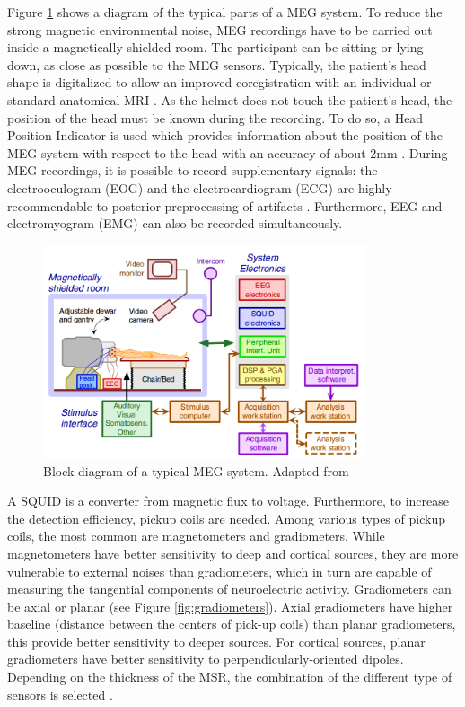 Figure \ref{fig:MEGdiagram} shows a diagram of the typical parts of a MEG system. To reduce the strong magnetic environmental noise, MEG recordings have to be carried out inside a magnetically shielded room. The participant can be sitting or lying down, as close as possible to the MEG sensors. Typically, the patient's head shape is digitalized to allow an improved coregistration with an individual or standard anatomical MRI \citep{Gross2013}. As the helmet does not touch the patient's head, the position of the head must be known during the recording. To do so, a Head Position Indicator is used which provides information about the position of the MEG system with respect to the head with an accuracy of about 2mm \citep{Hari2004}. During MEG recordings, it is possible to record supplementary signals: the electrooculogram (EOG) and the electrocardiogram (ECG) are highly recommendable to posterior preprocessing of artifacts \citep{Gross2013}. Furthermore, EEG and electromyogram (EMG) can also be recorded simultaneously. 

\begin{figure}[ht]
\centering
\includegraphics[width=0.85\textwidth]{Images/MEGsystem.png}
\caption{Block diagram of a typical MEG system. Adapted from \citet{Sternickel2006}}
\label{fig:MEGdiagram}
\end{figure}   

A SQUID is a converter from magnetic flux to voltage. Furthermore, to increase the detection efficiency, pickup coils are needed. Among various types of pickup coils, the most common are magnetometers and gradiometers. While magnetometers have better sensitivity to deep and cortical sources, they are more vulnerable to external noises than gradiometers, which in turn are capable of measuring the tangential components of neuroelectric activity. Gradiometers can be axial or planar (see Figure \ref{fig:gradiometers}). Axial gradiometers have higher baseline (distance between the centers of pick-up coils) than planar gradiometers, this provide better sensitivity to deeper sources. For cortical sources, planar gradiometers have better sensitivity to perpendicularly-oriented dipoles. Depending on the thickness of the MSR, the combination of the different type of sensors is selected \citep{Lee2014}. 


